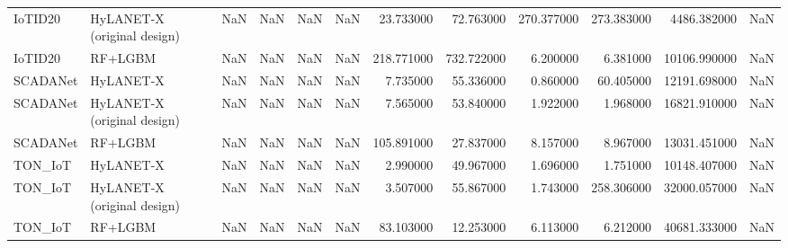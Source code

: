 \begin{tabular}{llrrrrrrrrrl}
IoTID20 & HyLANET-X (original design) & NaN & NaN & NaN & NaN & 23.733000 & 72.763000 & 270.377000 & 273.383000 & 4486.382000 & NaN \\
IoTID20 & RF+LGBM & NaN & NaN & NaN & NaN & 218.771000 & 732.722000 & 6.200000 & 6.381000 & 10106.990000 & NaN \\
SCADANet & HyLANET-X & NaN & NaN & NaN & NaN & 7.735000 & 55.336000 & 0.860000 & 60.405000 & 12191.698000 & NaN \\
SCADANet & HyLANET-X (original design) & NaN & NaN & NaN & NaN & 7.565000 & 53.840000 & 1.922000 & 1.968000 & 16821.910000 & NaN \\
SCADANet & RF+LGBM & NaN & NaN & NaN & NaN & 105.891000 & 27.837000 & 8.157000 & 8.967000 & 13031.451000 & NaN \\
TON\_IoT & HyLANET-X & NaN & NaN & NaN & NaN & 2.990000 & 49.967000 & 1.696000 & 1.751000 & 10148.407000 & NaN \\
TON\_IoT & HyLANET-X (original design) & NaN & NaN & NaN & NaN & 3.507000 & 55.867000 & 1.743000 & 258.306000 & 32000.057000 & NaN \\
TON\_IoT & RF+LGBM & NaN & NaN & NaN & NaN & 83.103000 & 12.253000 & 6.113000 & 6.212000 & 40681.333000 & NaN \\
\bottomrule
\end{tabular}
